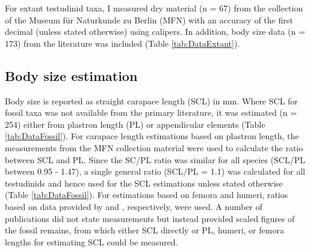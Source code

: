 For extant testudinid taxa, I measured dry material (n = 67) from the collection of the Museum für Naturkunde zu Berlin (MFN) with an accuracy of the first decimal (unless stated otherwise) using calipers. In addition, body size data (n = 173) from the literature was included (Table \ref{tab:DataExtant}).

\subsection{Body size estimation}
Body size is reported as straight carapace length (SCL) in mm. Where SCL for fossil taxa was not available from the primary literature, it was estimated (n = 254) either from plastron length (PL) or appendicular elements (Table \ref{tab:DataFossil}). For carapace length estimations based on plastron length, the measurements from the MFN collection material were used to calculate the ratio between SCL and PL. Since the SC/PL ratio was similar for all species (SCL/PL between 0.95 - 1.47), a single general ratio (SCL/PL = 1.1) was calculated for all testudinids and hence used for the SCL estimations unless stated otherwise (Table \ref{tab:DataFossil}). For estimations based on femora and humeri, ratios based on data provided by \cite{Hutterer1998} and \cite{Franz2001a}, respectively, were used. A number of publications did not state measurements but instead provided scaled figures of the fossil remains, from which either SCL directly or PL, humeri, or femora lengths for estimating SCL could be measured.




